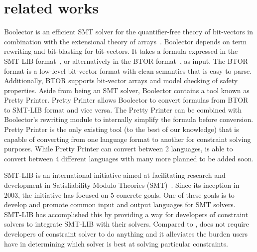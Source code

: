 \section{related works}
\label{sec:related}

Boolector is an efficient SMT solver for the quantifier-free theory
of bit-vectors in combination with the extensional theory of arrays~\cite{boolector2009}.
Boolector depends on term rewriting and bit-blasting for bit-vectors. It
takes a formula expressed in the SMT-LIB format~\cite{smtlib2015}, or alternatively in
the BTOR format~\cite{btor2008}, as input.
The BTOR format is a low-level bit-vector format with clean semantics that is easy to
parse. Additionally, BTOR supports bit-vector arrays and model checking of safety
properties.
Aside from being an SMT solver, Boolector contains a tool known as
Pretty Printer. Pretty Printer allows Boolector to convert formulas from BTOR to
SMT-LIB format and vice versa. The Pretty Printer can be combined with Boolector’s
rewriting module to internally simplify the formula before conversion.
Pretty Printer is the only existing tool (to the best of our knowledge) that is capable of
converting from one language format to another for constraint solving purposes.
While Pretty Printer can convert between 2 languages, \imss is able to convert
between 4 different languages with many more planned to be added soon.

SMT-LIB is an international initiative aimed at facilitating research and development in
Satisfiability Modulo Theories (SMT)~\cite{smtlib2015}. Since its inception in 2003, the
initiative has focused on 5 concrete goals. One of these goals is to develop and promote
common input and output languages for SMT solvers.
SMT-LIB has accomplished this by providing a way for developers of constraint solvers
to integrate SMT-LIB with their solvers.
Compared to \imss, \imss does not require developers of constraint solver to
do anything and it alleviates the burden users have in
determining which solver is best at solving particular constraints.

